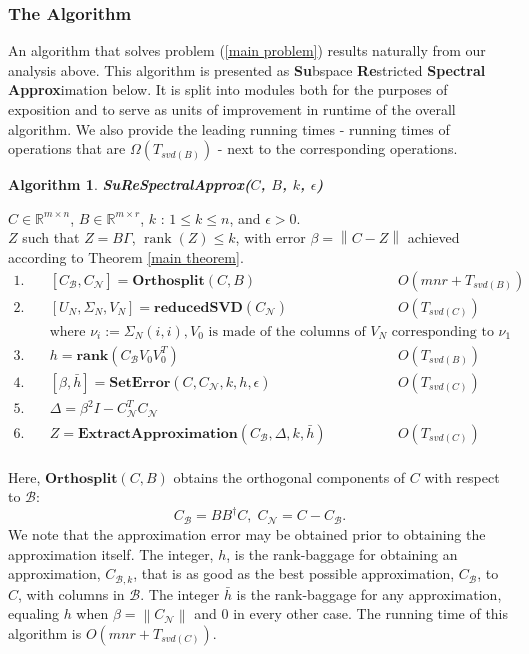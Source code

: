 \documentclass[11pt]{article}
\newcommand{\rank}{\operatorname{rank}}
\newtheorem{alg}{Algorithm}
\def\reals{\mathbb{R}}
\newcommand{\norm}[1]{\left\|#1\right\|}
\newcommand{\B}{\mathcal{B}}
\newcommand{\N}{\mathcal{N}}
\newcommand{\G}{\Gamma}
\newcommand{\0}{\ensuremath{\mathbf{0}}}
\renewcommand{\>}{\succ}
\newcommand{\<}{\prec}
\begin{document}
\subsubsection{The Algorithm}
An algorithm that solves problem (\ref{main problem}) results naturally from our analysis above. This algorithm is presented as \textbf{Su}bspace \textbf{Re}stricted \textbf{Spectral} \textbf{Approx}imation below. It is split into modules both for the purposes of exposition and to serve as units of improvement in runtime of the overall algorithm. We also provide the leading running times - running times of operations that are $\Omega(T_{svd(B)})$ - next to the corresponding operations.
\begin{framed}
\begin{alg}\label{alg:outline}
{\bf SuReSpectralApprox($C$, $B$, $k$, $\epsilon$) }
\end{alg}
 $C \in \reals^{m \times n}$, $B \in \reals^{m \times r}$, $k$ : $1 \leq k \leq n$, and $\epsilon > 0$.\\
 $Z$ such that $Z=B \G$, $\rank(Z) \leq k$, with error $\beta = \norm{C - Z}$ achieved according to Theorem \ref{main theorem}.
%
\begin{align*}
1. \quad& [C_{\B}, C_{\N}] = \textbf{Orthosplit}(C, B) & O(mnr + T_{svd(B)})\\
2. \quad& [U_N, \Sigma _N, V_N] = \textbf{reducedSVD}(C_{\N}) & O(T_{svd(C)}) \\ 
& \text{where } \nu_i := \Sigma _N (i, i), V_0 \text{ is made of the columns of  } V_N \text{ corresponding to } \nu_1 \\
3. \quad& h = \textbf{rank}(C_{\B} V_0 V_0 ^T)  & O\left(T_{svd(B)} \right)\\
4. \quad& [\beta,\bar h] = \textbf{SetError}(C, C_{\N}, k, h, \epsilon) & O\left( T_{svd(C)} \right) \\
5. \quad& \Delta = \beta^2 I - C_{\N} ^T C_{\N} & \\
6. \quad& Z = \textbf{ExtractApproximation}(C_{\B}, \Delta, k, \bar h) & O\left( T_{svd(C)} \right) \\
\end{align*}
%
\end{framed}

\noindent Here, $\textbf{Orthosplit}(C, B)$ obtains the orthogonal components of $C$ with respect to $\B$: 
\[ C_{\B} = BB^{\dagger} C, \; C_{\N} = C - C_{\B}. \] 
We note that the approximation error may be obtained prior to obtaining the approximation itself. The integer, $h$, is the rank-baggage for obtaining an approximation, $C_{\B, k}$, that is as good as the best possible approximation, $C_{\B}$, to $C$, with columns in $\B$. The integer $\bar{h}$ is the rank-baggage for any approximation, equaling $h$ when $\beta = \norm{C_{\N}}$ and 0 in every other case. The running time of this algorithm is $O\left( mnr + T_{svd(C)} \right)$.
\end{document}
